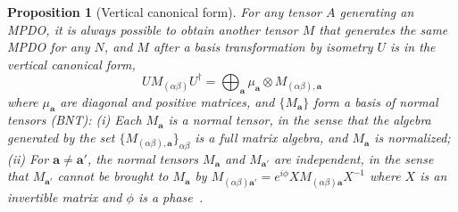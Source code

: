 \documentclass[prx, twocolumn, superscriptaddress, dvipsnames]{revtex4-2}
\newtheorem{prop}[thm]{Proposition}
\theoremstyle{definition}
\newcommand{\dg}{\dagger}
\newcommand{\vbnt}{\mathbf{a}}
\begin{document}
\begin{prop}[Vertical canonical form]
For any tensor $A$ generating an MPDO, it is always possible to obtain another tensor $M$ that generates the same MPDO for any $N$, and $M$ after a basis transformation by isometry $U$ is in the \textit{vertical canonical form},
   \begin{equation}
   \label{eqn:vcf-main}
    U M_{(\alpha\beta)} U^\dg=\bigoplus_\vbnt \mu_\vbnt\otimes M_{(\alpha\beta),\vbnt}
\end{equation} 
where $\mu_\vbnt$ are diagonal and positive matrices, and $\{M_\vbnt\}$ form a \textit{basis of normal tensors} (BNT): (i) Each $M_\vbnt$ is a normal tensor, in the sense that the algebra generated by the set $\{M_{(\alpha\beta),\vbnt}\}_{\alpha\beta}$ is a full matrix algebra, and $M_\vbnt$ is normalized; (ii) For $\vbnt\neq \vbnt'$, the normal tensors $M_\vbnt$ and $M_{\vbnt'}$ are independent, in the sense that $M_{\vbnt'}$ cannot be brought to $M_\vbnt$ by $M_{(\alpha\beta)\vbnt'}=e^{i\phi} XM_{(\alpha\beta)\vbnt}X^{-1}$ where $X$ is an invertible matrix and $\phi$ is a phase~\cite{cirac2017matrix}. 
\end{prop}
\end{document}
